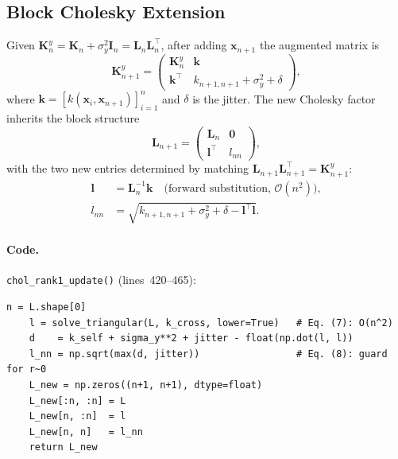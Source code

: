\documentclass[11pt,a4paper]{article}
\newcommand{\bx}{\bm{x}}
\newcommand{\bK}{\bm{K}}
\newcommand{\bL}{\bm{L}}
\theoremstyle{remark}
\newcommand{\coderange}[2]{lines~#1--#2}
\newcommand{\codefn}[1]{\texttt{#1()}}
\begin{document}
\subsection{Block Cholesky Extension}

Given $\bm{K}_n^y = \bK_n + \sigma_y^2\bm{I}_n = \bL_n\bL_n^\top$, after
adding $\bx_{n+1}$ the augmented matrix is
\begin{equation}
  \bm{K}_{n+1}^y =
  \begin{pmatrix}
    \bm{K}_n^y & \bm{k} \\
    \bm{k}^\top & k_{n+1,n+1} + \sigma_y^2 + \delta
  \end{pmatrix},
\end{equation}
where $\bm{k} = [k(\bx_i, \bx_{n+1})]_{i=1}^n$ and $\delta$ is the jitter.
The new Cholesky factor inherits the block structure
\begin{equation}
  \label{eq:chol_block}
  \bL_{n+1} =
  \begin{pmatrix}
    \bL_n & \bm{0} \\
    \bm{l}^\top & l_{nn}
  \end{pmatrix},
\end{equation}
with the two new entries determined by matching
$\bL_{n+1}\bL_{n+1}^\top = \bm{K}_{n+1}^y$:
\begin{align}
  \label{eq:chol_l}
  \bm{l}   &= \bL_n^{-1}\bm{k}
             \quad \text{(forward substitution, $\mathcal{O}(n^2)$)}, \\
  \label{eq:chol_lnn}
  l_{nn}   &= \sqrt{k_{n+1,n+1} + \sigma_y^2 + \delta - \bm{l}^\top\bm{l}}.
\end{align}

\paragraph{Code.} \codefn{chol\_rank1\_update} (\coderange{420}{465}):

\begin{lstlisting}[firstnumber=454, caption=Cholesky extension in \codefn{chol\_rank1\_update}]
    n = L.shape[0]
    l = solve_triangular(L, k_cross, lower=True)   # Eq. (7): O(n^2)
    d    = k_self + sigma_y**2 + jitter - float(np.dot(l, l))
    l_nn = np.sqrt(max(d, jitter))                 # Eq. (8): guard for r~0
    L_new = np.zeros((n+1, n+1), dtype=float)
    L_new[:n, :n] = L
    L_new[n, :n]  = l
    L_new[n, n]   = l_nn
    return L_new
\end{lstlisting}
\end{document}
